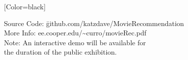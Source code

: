 \documentclass{article}
\begin{document}
\hfill
\begin{minipage}{10in}
{
	[Color=black]
	\fontsize{0.6in}{8em}\selectfont
	\begin{tabbing}
	Source Code: \= github.com/katzdave/MovieRecommendation\\
	More Info: \> ee.cooper.edu/\textasciitilde{}curro/movieRec.pdf\\
	Note: \> An interactive demo will be available for \\ \> the duration of the public exhibition.
	\end{tabbing}
} \end{minipage} 
\end{document}
